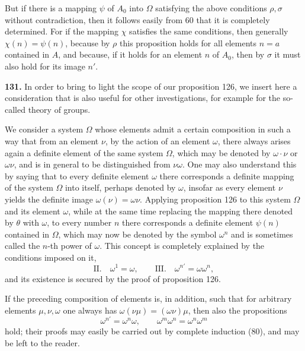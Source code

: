\documentclass[11pt]{article}
\begin{document}
But if there is a mapping $\psi$ of $A_0$ into $\Omega$ satisfying the above conditions $\rho,\sigma$ without contradiction, then it follows easily from 60 that it is completely determined. For if the mapping $\chi$ satisfies the same conditions, then generally $\chi(n)=\psi(n)$, because by $\rho$ this proposition holds for all elements $n=a$ contained in $A$, and because, if it holds for an element $n$ of $A_0$, then by $\sigma$ it must also hold for its image $n'$.

\noindent\textbf{131.} In order to bring to light the scope of our proposition 126, we insert here a consideration that is also useful for other investigations, for example for the so-called theory of groups.

We consider a system $\Omega$ whose elements admit a certain composition in such a way that from an element $\nu$, by the action of an element $\omega$, there always arises again a definite element of the same system $\Omega$, which may be denoted by $\omega\cdot\nu$ or $\omega\nu$, and is in general to be distinguished from $\nu\omega$. One may also understand this by saying that to every definite element $\omega$ there corresponds a definite mapping of the system $\Omega$ into itself, perhaps denoted by $\omega$, insofar as every element $\nu$ yields the definite image $\omega(\nu)=\omega\nu$. Applying proposition 126 to this system $\Omega$ and its element $\omega$, while at the same time replacing the mapping there denoted by $\theta$ with $\omega$, to every number $n$ there corresponds a definite element $\psi(n)$ contained in $\Omega$, which may now be denoted by the symbol $\omega^n$ and is sometimes called the $n$-th power of $\omega$. This concept is completely explained by the conditions imposed on it,
\[
\text{II.}\quad \omega^1=\omega,
\qquad
\text{III.}\quad \omega^{n'}=\omega\omega^n,
\]
and its existence is secured by the proof of proposition 126.

If the preceding composition of elements is, in addition, such that for arbitrary elements $\mu,\nu,\omega$ one always has $\omega(\nu\mu)=(\omega\nu)\mu$, then also the propositions
\[
\omega^{n'}=\omega^n\omega,
\qquad
\omega^m\omega^n=\omega^n\omega^m
\]
hold; their proofs may easily be carried out by complete induction (80), and may be left to the reader.
\end{document}
